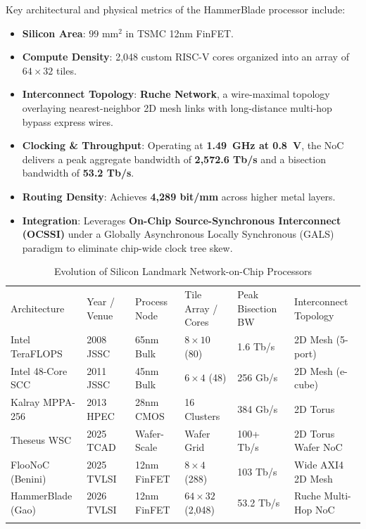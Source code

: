 Key architectural and physical metrics of the HammerBlade processor include:
\begin{itemize}
    \item \textbf{Silicon Area}: $99\text{ mm}^2$ in TSMC 12nm FinFET.
    \item \textbf{Compute Density}: 2,048 custom RISC-V cores organized into an array of $64 \times 32$ tiles.
    \item \textbf{Interconnect Topology}: \textbf{Ruche Network}, a wire-maximal topology overlaying nearest-neighbor 2D mesh links with long-distance multi-hop bypass express wires.
    \item \textbf{Clocking \& Throughput}: Operating at \textbf{1.49~GHz at 0.8~V}, the NoC delivers a peak aggregate bandwidth of \textbf{2,572.6 Tb/s} and a bisection bandwidth of \textbf{53.2 Tb/s}.
    \item \textbf{Routing Density}: Achieves \textbf{4,289 bit/mm} across higher metal layers.
    \item \textbf{Integration}: Leverages \textbf{On-Chip Source-Synchronous Interconnect (OCSSI)} under a Globally Asynchronous Locally Synchronous (GALS) paradigm to eliminate chip-wide clock tree skew.
\end{itemize}

\begin{table}[t]
\caption{Evolution of Silicon Landmark Network-on-Chip Processors}
\label{tab:noc_evolution}
\begin{tabular}{p{2.8cm}p{1.8cm}p{1.8cm}p{2.0cm}p{2.0cm}p{2.2cm}}
\hline\noalign{\smallskip}
Architecture & Year / Venue & Process Node & Tile Array / Cores & Peak Bisection BW & Interconnect Topology \\
\noalign{\smallskip}\svhline\noalign{\smallskip}
Intel TeraFLOPS & 2008 JSSC~\cite{Vangal2008} & 65nm Bulk & $8\times 10$ (80) & 1.6 Tb/s & 2D Mesh (5-port) \\
Intel 48-Core SCC & 2011 JSSC~\cite{Howard2011} & 45nm Bulk & $6\times 4$ (48) & 256 Gb/s & 2D Mesh (e-cube) \\
Kalray MPPA-256 & 2013 HPEC~\cite{Dinechin2013} & 28nm CMOS & 16 Clusters & 384 Gb/s & 2D Torus \\
Theseus WSC & 2025 TCAD~\cite{Zhu2025} & Wafer-Scale & Wafer Grid & 100+ Tb/s & 2D Torus Wafer NoC \\
FlooNoC (Benini) & 2025 TVLSI~\cite{Fischer2025} & 12nm FinFET & $8\times 4$ (288) & 103 Tb/s & Wide AXI4 2D Mesh \\
HammerBlade (Gao)& 2026 TVLSI~\cite{Gao2026} & 12nm FinFET & $64\times 32$ (2,048) & 53.2 Tb/s & Ruche Multi-Hop NoC \\
\noalign{\smallskip}\hline\noalign{\smallskip}
\end{tabular}
\end{table}

